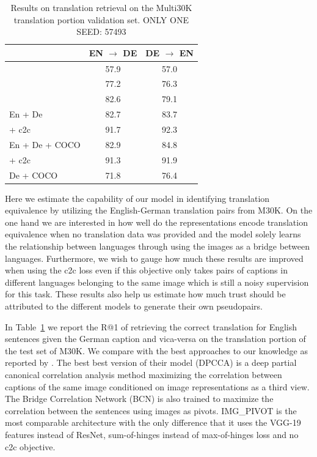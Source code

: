 \begin{table}[]
    \centering
    \begin{tabular}{lcc}
    \toprule
    & EN $\rightarrow$ DE & DE $\rightarrow$ EN \\
    \midrule
    \citet{rajendran2015bridge} & 57.9 & 57.0 \\
    \citet{gella2017image} &  77.2 & 76.3 \\
    \citet{rotman2018bridging} &  82.6 & 79.1 \\
    \midrule
    En + De & 82.7   & 83.7  \\
    \; + c2c & 91.7   & 92.3  \\
    En + De + COCO & 82.9    & 84.8    \\
    \; + c2c & 91.3   & 91.9  \\
    De + COCO & 71.8 &  76.4  \\
        \bottomrule
    \end{tabular}
    \caption{Results on translation retrieval on the Multi30K translation portion validation set. ONLY ONE SEED: 57493}
    \label{tab:translate}
\end{table}

Here we estimate the capability of our model in identifying
translation equivalence by utilizing the English-German
translation pairs from M30K. 
On the one hand we are interested in how well
do the representations encode translation equivalence when 
no translation data was provided and the model solely learns the 
relationship between languages through using the images 
as a bridge between languages. 
Furthermore, we wish to gauge how much these results 
are improved when using
the c2c loss even if this objective only takes pairs
of captions in different languages belonging to the same image
which is still a noisy supervision for this task.
These results also help us estimate how much 
trust should be attributed to the different models
to generate their own pseudopairs.

In Table~\ref{tab:translate}
we report the R@1 of retrieving the correct translation for 
English sentences given the German caption and vica-versa on 
the translation portion of the test set of M30K.
We compare with the best approaches to our knowledge as
reported by \cite{rotman2018bridging}. 
The best best version of their
model (DPCCA) is a deep partial canonical correlation 
analysis method maximizing the correlation between
captions of the same image conditioned 
on image representations as a third view. 
The Bridge Correlation Network (BCN) 
\cite{rajendran2015bridge} is also trained to maximize the 
correlation between the sentences using images as pivots.
IMG\_PIVOT \cite{gella2017image} is the most comparable architecture
with the only difference that it uses the VGG-19 
features instead of ResNet, sum-of-hinges instead 
of max-of-hinges loss and no c2c objective. 

